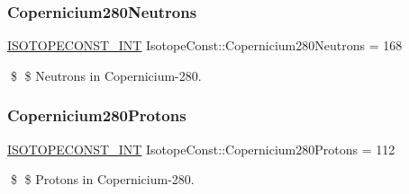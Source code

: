 \subsubsection{\texorpdfstring{Copernicium280\+Neutrons}{Copernicium280Neutrons}}
{\footnotesize\ttfamily \mbox{\hyperlink{group___isotope_const-_macros_ga5f18360b3e99483a35c32d789e62621c}{I\+S\+O\+T\+O\+P\+E\+C\+O\+N\+S\+T\+\_\+\+I\+NT}} Isotope\+Const\+::\+Copernicium280\+Neutrons = 168}

\$ \$ Neutrons in Copernicium-\/280. \mbox{\label{group___isotope_const-_copernicium-_cn280_ga7b25a159ee0df225f49af0deed6faf3d}} 
\subsubsection{\texorpdfstring{Copernicium280\+Protons}{Copernicium280Protons}}
{\footnotesize\ttfamily \mbox{\hyperlink{group___isotope_const-_macros_ga5f18360b3e99483a35c32d789e62621c}{I\+S\+O\+T\+O\+P\+E\+C\+O\+N\+S\+T\+\_\+\+I\+NT}} Isotope\+Const\+::\+Copernicium280\+Protons = 112}

\$ \$ Protons in Copernicium-\/280. 
